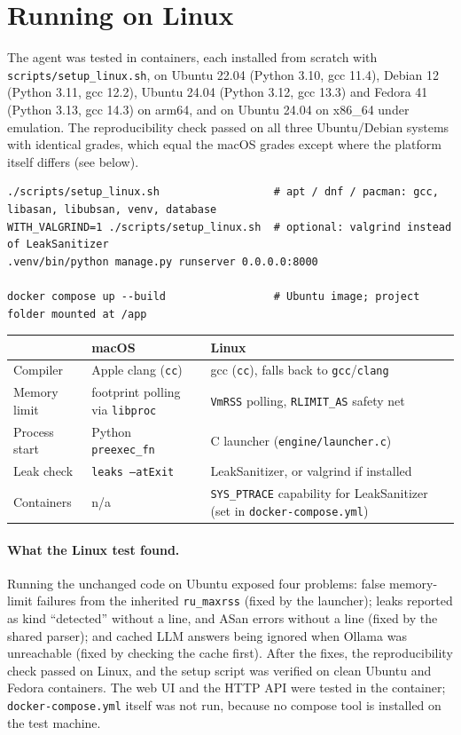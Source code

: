 \documentclass[11pt,a4paper]{article}
\newcommand{\file}[1]{\nolinkurl{#1}}
\newcommand{\fn}[1]{\nolinkurl{#1}}
\begin{document}
\section{Running on Linux}\label{sec:linux}
The agent was tested in containers, each installed from scratch with \file{scripts/setup_linux.sh}, on Ubuntu 22.04
(Python 3.10, gcc 11.4), Debian 12 (Python 3.11, gcc 12.2), Ubuntu 24.04 (Python 3.12, gcc 13.3) and Fedora 41
(Python 3.13, gcc 14.3) on arm64, and on Ubuntu 24.04 on x86\_64 under emulation. The reproducibility check passed on
all three Ubuntu/Debian systems with identical grades, which equal the macOS grades except where the platform itself
differs (see below).

\begin{lstlisting}
./scripts/setup_linux.sh                  # apt / dnf / pacman: gcc, libasan, libubsan, venv, database
WITH_VALGRIND=1 ./scripts/setup_linux.sh  # optional: valgrind instead of LeakSanitizer
.venv/bin/python manage.py runserver 0.0.0.0:8000

docker compose up --build                 # Ubuntu image; project folder mounted at /app
\end{lstlisting}

\noindent\begin{tabularx}{\textwidth}{@{}>{\raggedright\arraybackslash}p{2.8cm}LL@{}}
\toprule
 & \textbf{macOS} & \textbf{Linux} \\
\midrule
Compiler & Apple clang (\texttt{cc}) & gcc (\texttt{cc}), falls back to \texttt{gcc}/\texttt{clang} \\
Memory limit & footprint polling via \texttt{libproc} & \texttt{VmRSS} polling, \texttt{RLIMIT\_AS} safety net \\
Process start & Python \fn{preexec_fn} & C launcher (\file{engine/launcher.c}) \\
Leak check & \texttt{leaks --atExit} & LeakSanitizer, or valgrind if installed \\
Containers & n/a & \texttt{SYS\_PTRACE} capability for LeakSanitizer (set in \file{docker-compose.yml}) \\
\bottomrule
\end{tabularx}

\paragraph{What the Linux test found.} Running the unchanged code on Ubuntu exposed four problems: false memory-limit
failures from the inherited \texttt{ru\_maxrss} (fixed by the launcher); leaks reported as kind ``detected'' without a
line, and ASan errors without a line (fixed by the shared parser); and cached LLM answers being ignored when Ollama was
unreachable (fixed by checking the cache first). After the fixes, the reproducibility check passed on Linux, and the
setup script was verified on clean Ubuntu and Fedora containers. The web UI and the HTTP API were tested in the
container; \file{docker-compose.yml} itself was not run, because no compose tool is installed on the test machine.
\end{document}

